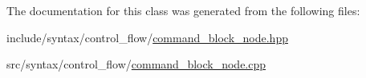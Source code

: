 The documentation for this class was generated from the following files\+:\begin{DoxyCompactItemize}
\item 
include/syntax/control\+\_\+flow/\hyperlink{command__block__node_8hpp}{command\+\_\+block\+\_\+node.\+hpp}\item 
src/syntax/control\+\_\+flow/\hyperlink{command__block__node_8cpp}{command\+\_\+block\+\_\+node.\+cpp}\end{DoxyCompactItemize}

